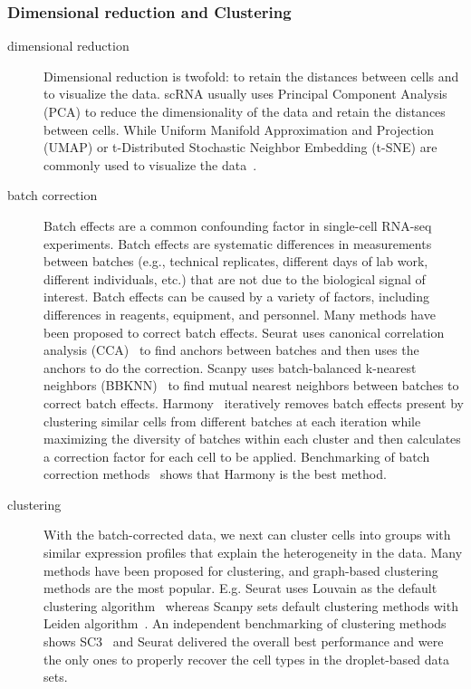 \subsubsection{Dimensional reduction and Clustering}
\begin{description}
	\item[dimensional reduction] Dimensional reduction is twofold: to retain the distances between cells and to visualize the data. scRNA usually uses Principal Component Analysis (PCA) to reduce the dimensionality of the data and retain the distances between cells. While Uniform Manifold Approximation and Projection (UMAP) or t-Distributed Stochastic Neighbor Embedding (t-SNE) are commonly used to visualize the data~\citep{mcinnes2018umap, van2008tsne}.
	\item[batch correction] Batch effects are a common confounding factor in single-cell RNA-seq experiments. Batch effects are systematic differences in measurements between batches (e.g., technical replicates, different days of lab work, different individuals, etc.) that are not due to the biological signal of interest. Batch effects can be caused by a variety of factors, including differences in reagents, equipment, and personnel. Many methods have been proposed to correct batch effects. Seurat uses canonical correlation analysis (CCA)~\citep{stuart2019seurat3} to find anchors between batches and then uses the anchors to do the correction. Scanpy uses batch-balanced k-nearest neighbors (BBKNN)~\citep{polanski2020bbknn} to find mutual nearest neighbors between batches to correct batch effects. Harmony~\citep{korsunsky2019harmony} iteratively removes batch effects present by clustering similar cells from different batches at each iteration while maximizing the diversity of batches within each cluster and then calculates a correction factor for each cell to be applied. Benchmarking of batch correction methods~\citep{tran2020benchmarking} shows that Harmony is the best method.
	\item[clustering] With the batch-corrected data, we next can cluster cells into groups with similar expression profiles that explain the heterogeneity in the data. Many methods have been proposed for clustering, and graph-based clustering methods are the most popular. E.g. Seurat uses Louvain as the default clustering algorithm~\citep{stuart2019seurat3} whereas Scanpy sets default clustering methods with Leiden algorithm~\citep{traag2019louvain}. An independent benchmarking of clustering methods ~\citep{duo2018benchclustering} shows SC3~\citep{kiselev2017sc3} and Seurat delivered the overall best performance and were the only ones to properly recover the cell types in the droplet-based data sets.

\end{description}
